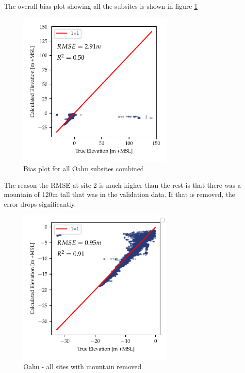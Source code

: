 

The overall bias plot showing all the subsites is shown in figure \ref{fig:oahu-all-bias-plot}

\begin{figure}[h]
    \centering
    \includegraphics[width=0.7\textwidth]{figures/Oahu_combined_lidar_estimated_vs_truth.pdf}
    \caption{Bias plot for all Oahu subsites combined}
    \label{fig:oahu-all-bias-plot}
\end{figure}

The reason the RMSE at site 2 is much higher than the rest is that there was a mountain of 120m tall that was in the validation data. If that is removed, the error drops significantly. 
\begin{figure}[h]
    \centering
    \includegraphics[width=0.7\textwidth]{figures/Oahu_combined_mountains_removed_lidar_estimated_vs_truth.pdf}
    \caption{Oahu - all sites with mountain removed}
    \label{fig:oahu-bias-no-mountains}
\end{figure}

